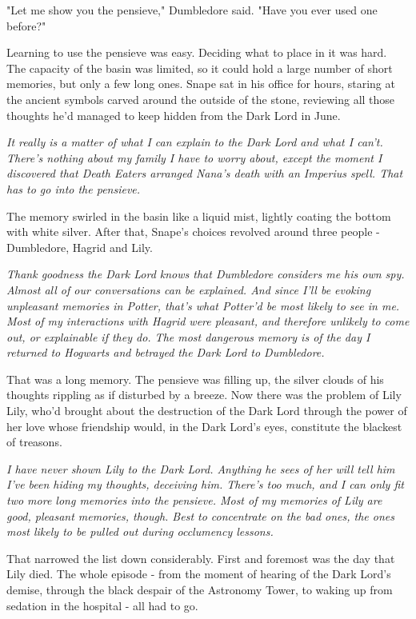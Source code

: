 "Let me show you the pensieve," Dumbledore said. "Have you ever used one before?"

Learning to use the pensieve was easy. Deciding what to place in it was hard. The capacity of the basin was limited, so it could hold a large number of short memories, but only a few long ones. Snape sat in his office for hours, staring at the ancient symbols carved around the outside of the stone, reviewing all those thoughts he'd managed to keep hidden from the Dark Lord in June.

\emph{It really is a matter of what I can explain to the Dark Lord and what I can't. There's nothing about my family I have to worry about, except the moment I discovered that Death Eaters arranged Nana's death with an Imperius spell. That has to go into the pensieve.}

The memory swirled in the basin like a liquid mist, lightly coating the bottom with white silver. After that, Snape's choices revolved around three people - Dumbledore, Hagrid{\el} and Lily.

\emph{Thank goodness the Dark Lord knows that Dumbledore considers me his own spy. Almost all of our conversations can be explained. And since I'll be evoking unpleasant memories in Potter, that's what Potter'd be most likely to see in me. Most of my interactions with Hagrid were pleasant, and therefore unlikely to come out, or explainable if they do. The most dangerous memory is of the day I returned to Hogwarts and betrayed the Dark Lord to Dumbledore.}

That was a long memory. The pensieve was filling up, the silver clouds of his thoughts rippling as if disturbed by a breeze. Now there was the problem of Lily{\el} Lily, who'd brought about the destruction of the Dark Lord through the power of her love{\el} whose friendship would, in the Dark Lord's eyes, constitute the blackest of treasons.

\emph{I have never shown Lily to the Dark Lord. Anything he sees of her will tell him I've been hiding my thoughts, deceiving him. There's too much, and I can only fit two more long memories into the pensieve. Most of my memories of Lily are good, pleasant memories, though. Best to concentrate on the bad ones, the ones most likely to be pulled out during occlumency lessons.}

That narrowed the list down considerably. First and foremost was the day that Lily died. The whole episode - from the moment of hearing of the Dark Lord's demise, through the black despair of the Astronomy Tower, to waking up from sedation in the hospital - all had to go.

